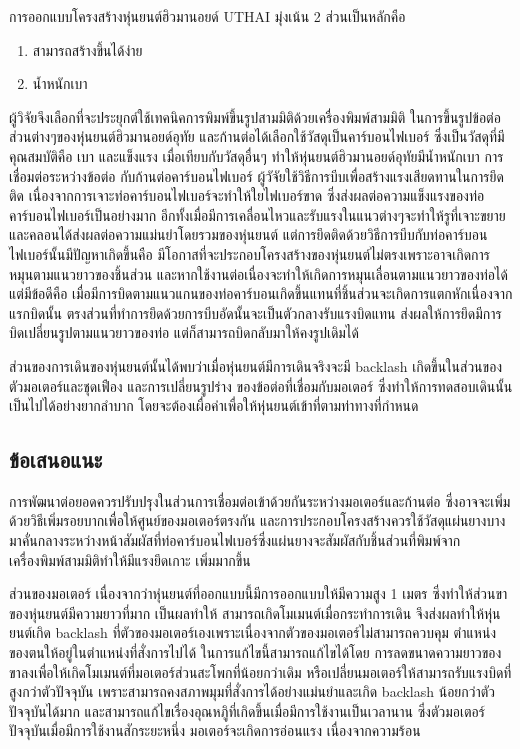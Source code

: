การออกแบบโครงสร้างหุ่นยนต์ฮิวมานอยด์ UTHAI มุ่งเน้น 2 ส่วนเป็นหลักคือ
\vspace{-3mm}
\begin{enumerate}[label=\arabic*, leftmargin=1.5cm]
	\setlength\itemsep{-0.25em}
	\item สามารถสร้างขึ้นได้ง่าย
	\item น้ำหนักเบา
\end{enumerate}

ผู้วิจัยจึงเลือกที่จะประยุกต์ใช้เทคนิคการพิมพ์ขึ้นรูปสามมิติด้วยเครื่องพิมพ์สามมิติ ในการขึ้นรูปข้อต่อส่วนต่างๆของหุ่นยนต์ฮิวมานอยด์อุทัย
และก้านต่อได้เลือกใช้วัสดุเป็นคาร์บอนไฟเบอร์ ซึ่งเป็นวัสดุที่มีคุณสมบัติคือ เบา และแข็งแรง เมื่อเทียบกับวัสดุอื่นๆ ทำให้หุ่นยนต์ฮิวมานอยด์อุทัยมีน้ำหนักเบา
การเชื่อมต่อระหว่างข้อต่อ กับก้านต่อคาร์บอนไฟเบอร์ ผู้วัจัยใช้วิธีการบีบเพื่อสร้างแรงเสียดทานในการยึดติด
เนื่องจากการเจาะท่อคาร์บอนไฟเบอร์จะทำให้ใยไฟเบอร์ขาด ซึ่งส่งผลต่อความแข็งแรงของท่อคาร์บอนไฟเบอร์เป็นอย่างมาก
อีกทั้งเมื่อมีการเคลื่อนไหวและรับแรงในแนวต่างๆจะทำให้รูที่เจาะขยายและคลอนได้ส่งผลต่อความแม่นยำโดยรวมของหุ่นยนต์
แต่การยึดติดด้วยวิธีการบีบกับท่อคาร์บอนไฟเบอร์นั้นมีปัญหาเกิดขึ้นคือ มีโอกาสที่จะประกอบโครงสร้างของหุ่นยนต์ไม่ตรงเพราะอาจเกิดการหมุนตามแนวยาวของชิ้นส่วน
และหากใช้งานต่อเนื่องจะทำให้เกิดการหมุนเลื่อนตามแนวยาวของท่อได้ แต่มีข้อดีคือ เมื่อมีการบิดตามแนวแกนของท่อคาร์บอนเกิดขึ้นแทนที่ชิ้นส่วนจะเกิดการแตกหักเนื่องจาก 
แรกบิดนั้น ตรงส่วนที่ทำการยึดด้วยการบีบอัดนั้นจะเป็นตัวกลางรับแรงบิดแทน ส่งผลให้การยึดมีการบิดเปลี่ยนรูปตามแนวยาวของท่อ แต่ก็สามารถบิดกลับมาให้คงรูปเดิมได้

ส่วนของการเดินของหุ่นยนต์นั้นได้พบว่าเมื่อหุ่นยนต์มีการเดินจริงจะมี backlash เกิดขึ้นในส่วนของตัวมอเตอร์และชุดเฟือง และการเปลี่ยนรูปร่าง
ของข้อต่อที่เชื่อมกับมอเตอร์ ซึ่งทำให้การทดสอบเดินนั้นเป็นไปได้อย่างยากลำบาก โดยจะต้องเผื่อค่าเพื่อให้หุ่นยนต์เข้าที่ตามท่าทางที่กำหนด  

\subsection*{ข้อเสนอแนะ}

การพัฒนาต่อยอดควรปรับปรุงในส่วนการเชื่อมต่อเข้าด้วยกันระหว่างมอเตอร์และก้านต่อ ซึ่งอาจจะเพิ่มด้วยวิธีเพิ่มรอยบากเพื่อให้ศูนย์ของมอเตอร์ตรงกัน
และการประกอบโครงสร้างควรใช้วัสดุแผ่นยางบางมาคั่นกลางระหว่างหน้าสัมผัสที่ท่อคาร์บอนไฟเบอร์ซึ่งแผ่นยางจะสัมผัสกับชิ้นส่วนที่พิมพ์จากเครื่องพิมพ์สามมิติทำให้มีแรงยึดเกาะ
เพิ่มมากขึ้น

ส่วนของมอเตอร์ เนื่องจากว่าหุ่นยนต์ที่ออกแบบนี้มีการออกแบบให้มีความสูง 1 เมตร ซึ่งทำให้ส่วนขาของหุ่นยนต์มีความยาวที่มาก เป็นผลทำให้
สามารถเกิดโมเมนต์เมื่อกระทำการเดิน จึงส่งผลทำให้หุ่นยนต์เกิด backlash ที่ตัวของมอเตอร์เองเพราะเนื่องจากตัวของมอเตอร์ไม่สามารถควบคุม
ตำแหน่งของตนให้อยู่ในตำแหน่งที่สั่งการไปได้ ในการแก้ไขนี้สามารถแก้ไขได้โดย การลดขนาดความยาวของขาลงเพื่อให้เกิดโมเมนต์ที่มอเตอร์ส่วนสะโพกที่น้อยกว่าเดิม
หรือเปลี่ยนมอเตอร์ให้สามารถรับแรงบิดที่สูงกว่าตัวปัจจุบัน เพราะสามารถคงสภาพมุมที่สั่งการได้อย่างแม่นยำและเกิด backlash น้อยกว่าตัวปัจจุบันได้มาก
และสามารถแก้ไขเรื่องอุณหภูิที่เกิดขึ้นเมื่อมีการใช้งานเป็นเวลานาน ซึ่งตัวมอเตอร์ปัจจุบันเมื่อมีการใช้งานสักระยะหนึ่ง มอเตอร์จะเกิดการอ่อนแรง เนื่องจากความร้อน

